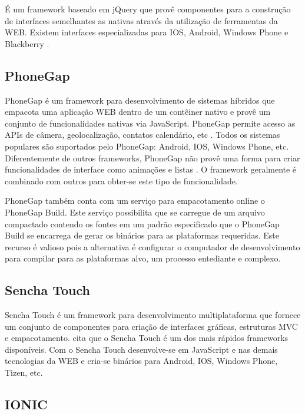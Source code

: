 É um framework baseado em jQuery que provê componentes para  a construção de
interfaces semelhantes as nativas através da utilização de ferramentas da WEB.
Existem interfaces especializadas para IOS, Android, Windows Phone e Blackberry \autocite{kendoui}.

\subsection{PhoneGap}

PhoneGap é um framework para desenvolvimento de sistemas híbridos que
empacota uma aplicação WEB dentro de um contêiner nativo e provê um
conjunto de funcionalidades nativas via JavaScript. PhoneGap permite
acesso as APIs de câmera, geolocalização, contatos calendário,
etc \autocite[pp. 3]{crossPlatformAppsAnimations}. Todos os sistemas
populares são suportados pelo PhoneGap: Android, IOS, Windows Phone,
etc. Diferentemente de outros frameworks, PhoneGap não provê uma
forma para criar funcionalidades de interface como animações e listas
\autocite[pp. 15]{viabilityBusinessApplications}. O framework 
geralmente é combinado com outros para obter-se este tipo de funcionalidade.

PhoneGap também conta com um serviço para empacotamento online o
PhoneGap Build. Este serviço possibilita que se carregue de um arquivo
compactado contendo os fontes em um padrão especificado que o PhoneGap
Build se encarrega de gerar os binários para as plataformas requeridas.
Este recurso é valioso pois a alternativa é configurar o computador
de desenvolvimento para compilar para as plataformas alvo, um processo
entediante e complexo.

\subsection{Sencha Touch}
Sencha Touch é um framework para desenvolvimento multiplataforma
que fornece um conjunto de componentes para criação de
interfaces gráficas, estruturas MVC e empacotamento. \cite[pp.
14]{viabilityBusinessApplications} cita que o Sencha Touch é um dos
mais rápidos frameworks disponíveis. Com o Sencha Touch desenvolve-se
em JavaScript e nas demais tecnologias da WEB e cria-se binários para
Android, IOS, Windows Phone, Tizen, etc.

\subsection{IONIC}



